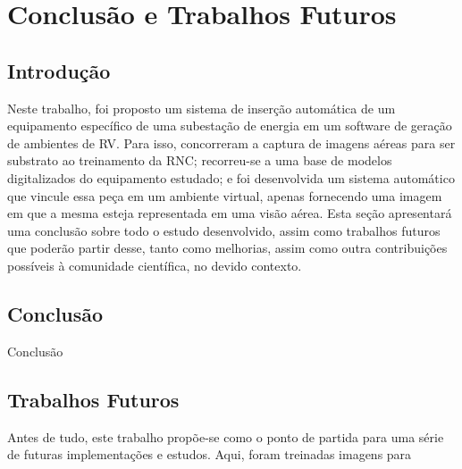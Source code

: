 \chapter{Conclusão e Trabalhos Futuros}


\section{Introdução} 

Neste trabalho, foi proposto um sistema de inserção automática de um equipamento específico de uma subestação de energia em um software de geração de ambientes de RV. Para isso, concorreram a captura de imagens aéreas para ser substrato ao treinamento da RNC; recorreu-se a uma base de modelos digitalizados do equipamento estudado; e foi desenvolvida um sistema automático que vincule essa peça em um ambiente virtual, apenas fornecendo uma imagem em que a mesma esteja representada em uma visão aérea. Esta seção apresentará uma conclusão sobre todo o estudo desenvolvido, assim como trabalhos futuros que poderão partir desse, tanto como melhorias, assim como outra contribuições possíveis à comunidade científica, no devido contexto.

\section{Conclusão} 

Conclusão

\section{Trabalhos Futuros} 

Antes de tudo, este trabalho propõe-se como o ponto de partida para uma série de futuras implementações e estudos. Aqui, foram treinadas imagens para  




%
%


